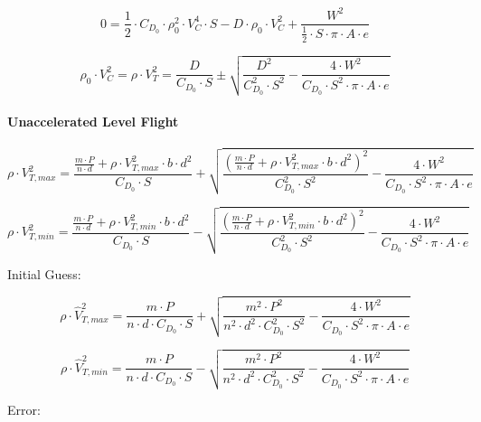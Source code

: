 \documentclass[a4paper,10pt,pdftex]{article}
\begin{document}
\begin{equation}
  0 = \frac{1}{2}\cdot{}C_{D_0}\cdot\rho_0^2\cdot{}V_C^4\cdot{}S
    - D\cdot\rho_0\cdot{}V_C^2
    + \frac{W^2}{\frac{1}{2}\cdot{}S\cdot\pi\cdot{}A\cdot{}e}
\end{equation}

\begin{equation}
  \rho_0\cdot{}V_C^2 = \rho\cdot{}V_T^2 = \frac{D}{C_{D_0}\cdot{}S}\pm\sqrt{\frac{D^2}{C_{D_0}^2\cdot{}S^2}-\frac{4\cdot{}W^2}{C_{D_0}\cdot{}S^2\cdot\pi\cdot{}A\cdot{}e}}
\end{equation}

\paragraph{Unaccelerated Level Flight}

\begin{equation}
  \rho\cdot{}V_{T,max}^2 = \frac{\frac{m\cdot{}P}{n\cdot{}d}+\rho\cdot{}V_{T,max}^2\cdot{}b\cdot{}d^2}{C_{D_0}\cdot{}S}
  +\sqrt{\frac{\left(\frac{m\cdot{}P}{n\cdot{}d}+\rho\cdot{}V_{T,max}^2\cdot{}b\cdot{}d^2\right)^2}{C_{D_0}^2\cdot{}S^2}-\frac{4\cdot{}W^2}{C_{D_0}\cdot{}S^2\cdot\pi\cdot{}A\cdot{}e}}
\end{equation}

\begin{equation}
  \rho\cdot{}V_{T,min}^2 = \frac{\frac{m\cdot{}P}{n\cdot{}d}+\rho\cdot{}V_{T,min}^2\cdot{}b\cdot{}d^2}{C_{D_0}\cdot{}S}
  -\sqrt{\frac{\left(\frac{m\cdot{}P}{n\cdot{}d}+\rho\cdot{}V_{T,min}^2\cdot{}b\cdot{}d^2\right)^2}{C_{D_0}^2\cdot{}S^2}-\frac{4\cdot{}W^2}{C_{D_0}\cdot{}S^2\cdot\pi\cdot{}A\cdot{}e}}
\end{equation}

Initial Guess:

\begin{equation}
  \rho\cdot{}\hat{V}_{T,max}^2 = \frac{m\cdot{}P}{n\cdot{}d\cdot{}C_{D_0}\cdot{}S}
  +\sqrt{\frac{m^2\cdot{}P^2}{n^2\cdot{}d^2\cdot{}C_{D_0}^2\cdot{}S^2}-\frac{4\cdot{}W^2}{C_{D_0}\cdot{}S^2\cdot\pi\cdot{}A\cdot{}e}}
\end{equation}

\begin{equation}
  \rho\cdot{}\hat{V}_{T,min}^2 = \frac{m\cdot{}P}{n\cdot{}d\cdot{}C_{D_0}\cdot{}S}
  -\sqrt{\frac{m^2\cdot{}P^2}{n^2\cdot{}d^2\cdot{}C_{D_0}^2\cdot{}S^2}-\frac{4\cdot{}W^2}{C_{D_0}\cdot{}S^2\cdot\pi\cdot{}A\cdot{}e}}
\end{equation}

Error:
\end{document}
